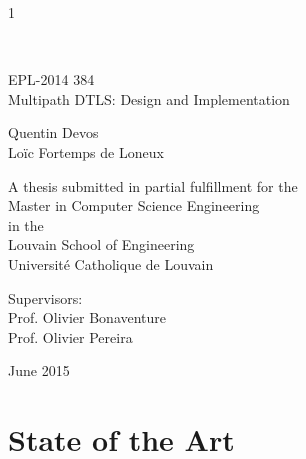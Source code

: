 \documentclass[11pt,a4paper,oldfontcommands]{memoir}
\newcommand\draft{1}
\begin{document}
%
%
\draft
\thispagestyle{empty}

{%
\sffamily
\centering
\Large

~\vspace{\fill}

EPL-2014 384\\
{\huge 
Multipath DTLS: Design and Implementation
}

\vspace{2.5cm}

{\LARGE
Quentin Devos \\
Loïc Fortemps de Loneux
}

\vspace{3.5cm}

A thesis submitted in partial fulfillment for the\\
Master in Computer Science Engineering\\[1em]
in the\\[1em]
Louvain School of Engineering\\
Université Catholique de Louvain

\vspace{3.5cm}

Supervisors: \\
Prof. Olivier Bonaventure\\
Prof. Olivier Pereira

\vspace{\fill}

June 2015

}%

\cleardoublepage

\tableofcontents*
\clearpage

\listoffigures*
\clearpage

\lstlistoflistings*
\clearpage



\markboth{}{}
\part{State of the Art}


\markboth{}{}
\end{document}
